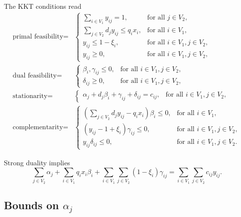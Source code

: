 The KKT conditions read
\begin{align*}
    \text{primal feasibility} = & 
    \begin{cases}
        \sum_{i\in V_1} y_{ij} = 1, & \text{for all } j\in V_2, \\
        \sum_{j\in V_2} d_jy_{ij} \le q_ix_i, & \text{for all } i\in V_1, \\
        y_{ij} \le 1 - \xi_i, & \text{for all } i\in V_1, j\in V_2, \\
        y_{ij} \ge 0, & \text{for all } i\in V_1, j\in V_2,
    \end{cases} \\
    \text{dual feasibility} = & 
    \begin{cases}
        \beta_i, \gamma_{ij} \le 0, &\text{for all } i\in V_1, j\in V_2, \\
        \delta_{ij} \ge 0, &\text{for all } i\in V_1, j\in V_2,
    \end{cases} \\
    \text{stationarity} = & 
    \begin{cases}
        \alpha_j + d_j\beta_i + \gamma_{ij} + \delta_{ij} = c_{ij}, & \text{for all } i\in V_1, j\in V_2,
    \end{cases} \\
    \text{complementarity} = & 
    \begin{cases}
        \left( \sum_{j\in V_2} d_jy_{ij} - q_ix_i \right) \beta_i \le 0, & \text{for all } i\in V_1, \\
        \left( y_{ij} - 1 + \xi_i \right) \gamma_{ij} \le 0, & \text{for all } i\in V_1, j\in V_2, \\
        y_{ij}\delta_{ij} \le 0, & \text{for all } i\in V_1, j\in V_2.
    \end{cases}
\end{align*}

Strong duality implies
\begin{equation}
    \sum_{j\in V_2} \alpha_j + \sum_{i\in V_1} q_ix_i\beta_i + \sum_{i\in V_1}\sum_{j\in V_2} \left( 1 - \xi_i \right)\gamma_{ij}
    = \sum_{i\in V_1} \sum_{j\in V_2} c_{ij} y_{ij}.
\end{equation}

\subsection*{Bounds on $\alpha_j$} 

